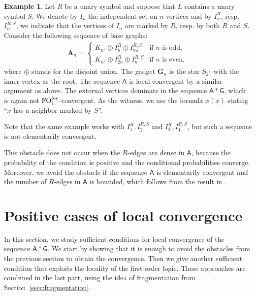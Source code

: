 \documentclass[11pt]{article}
\theoremstyle{plain}
\theoremstyle{definition}
\newtheorem{example}{Example}
\theoremstyle{remark}
\DeclareMathOperator\FO{FO}
\newcommand{\FOloc}[1]{\FO_{#1}^\textnormal{loc}}
\newcommand{\str}[1]{\mathbf{#1}}
\newcommand{\strseq}[1]{{\boldsymbol{\mathsf{#1}}}}
\begin{document}
\begin{example}\label{ex:magnification}
    Let $R$ be a unary symbol and suppose that $L$ contains a unary symbol $S$.
    We denote by $I_n$ the independent set on $n$ vertices and by $I_n^R$, resp. $I_n^{R,S}$, we indicate that the vertices of $I_n$ are marked by $R$, resp. by both $R$ and $S$.
    Consider the following sequence of base graphs:
    \begin{align*}
        \str{A}_n =
        \begin{cases}
            K_{n^2} \oplus I_n^R \oplus I_{2n}^{R,S}
            & \text{if $n$ is odd}
            , \\
            K_{n^2} \oplus I_{2n}^R \oplus I_n^{R,S}
            & \text{if $n$ is even}
            ,
        \end{cases}
    \end{align*}
    where $\oplus$ stands for the disjoint union.
    The gadget $\str{G}_n$ is the star $S_{2^n}$ with the inner vertex as the root.
    The sequence $\strseq{A}$ is local convergent by a similar argument as above.
    The external vertices dominate in the sequence $\strseq{A}*\strseq{G}$, which is again not $\FOloc{1}$-convergent.
    As the witness, we use the formula $\phi(x)$ stating ``$x$ has a neighbor marked by $S$''.
    
    Note that the same example works with $I_1^R, I_2^{R,S}$ and $I_2^R, I_1^{R,S}$, but such a sequence is not elementarily convergent.
\end{example}

This obstacle does not occur when the $R$-edges are dense in $\strseq{A}$, because the probability of the condition is positive and the conditional probabilities converge.
Moreover, we avoid the obstacle if the sequence $\strseq{A}$ is elementarily convergent and the number of $R$-edges in $\strseq{A}$ is bounded, which follows from the result in \cite{rooting_algebraic_vertices}.

%
 \section{Positive cases of local convergence}\label{sec:positive_cases}

In this section, we study sufficient conditions for local convergence of the sequence $\strseq{A}*\strseq{G}$.
We start by showing that it is enough to avoid the obstacles from the previous section to obtain the convergence.
Then we give another sufficient condition that exploits the locality of the first-order logic.
These approaches are combined in the last part, using the idea of fragmentation from Section~\ref{ssec:fragmentation}.
\end{document}
